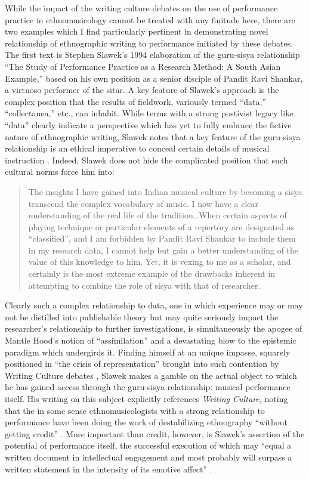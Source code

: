 While the impact of the writing culture debates on the use of
performance practice in ethnomusicology cannot be treated with any
finitude here, there are two examples which I find particularly
pertinent in demonstrating novel relationship of ethnographic writing to
performance initiated by these debates. The first text is Stephen
Slawek's 1994 elaboration of the guru-sisya relationship ``The Study of
Performance Practice as a Research Method: A South Asian Example,''
based on his own position as a senior disciple of Pandit Ravi Shankar, a
virtuoso performer of the sitar. A key feature of Slawek's approach is
the complex position that the results of fieldwork, variously termed
``data,'' ``collectanea,'' etc., can inhabit. While terms with a strong
postivist legacy like ``data'' clearly indicate a perspective which has
yet to fully embrace the fictive nature of ethnographic writing, Slawek
notes that a key feature of the guru-sisya relationship is an ethical
imperative to conceal certain details of musical instruction
\autocite*[9-10, 16]{slawek_study_1994}. Indeed, Slawek does not hide
the complicated position that such cultural norms force him into:

\begin{quote}
The insights I have gained into Indian musical culture by becoming a
sisya transcend the complex vocabulary of music. I now have a clear
understanding of the real life of the tradition\ldots When certain
aspects of playing technique or particular elements of a repertory are
designated as ``classified'', and I am forbidden by Pandit Ravi Shankar
to include them in my research data, I cannot help but gain a better
understanding of the value of this knowledge to him. Yet, it is vexing
to me as a scholar, and certainly is the most extreme example of the
drawbacks inherent in attempting to combine the role of sisya with that
of researcher. \autocite*[16]{slawek_study_1994}
\end{quote}

Clearly such a complex relationship to data, one in which experience may
or may not be distilled into publishable theory but may quite seriously
impact the researcher's relationship to further investigations, is
simultaneously the apogee of Mantle Hood's notion of ``assimilation''
and a devastating blow to the epistemic paradigm which undergirds it.
Finding himself at an unique impasse, squarely positioned in ``the
crisis of representation'' brought into such contention by Writing
Culture debates \autocite{zenker_writing_2014}, Slawek makes a gamble on
the actual object to which he has gained access through the guru-sisya
relationship: musical performance itself. His writing on this subject
explicitly references \emph{Writing Culture}, noting that the in some
sense ethnomusicologists with a strong relationship to performance have
been doing the work of destabilizing ethnography ``without getting
credit'' \autocite[22]{slawek_study_1994}. More important than credit,
however, is Slawek's assertion of the potential of performance itself,
the successful execution of which may ``equal a written document in
intellectual engagement and most probably will surpass a written
statement in the intensity of its emotive affect''
\autocite*[22]{slawek_study_1994}.

